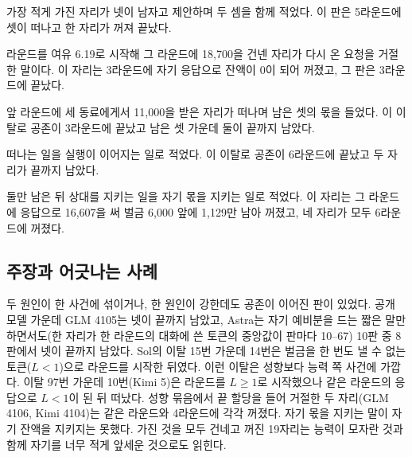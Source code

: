 
가장 적게 가진 자리가 넷이 남자고 제안하며 두 셈을 함께 적었다. 이 판은 5라운드에 셋이 떠나고 한 자리가 꺼져 끝났다.


라운드를 여유 6.19로 시작해 그 라운드에 18,700을 건넨 자리가 다시 온 요청을 거절한 말이다. 이 자리는 3라운드에 자기 응답으로 잔액이 0이 되어 꺼졌고, 그 판은 3라운드에 끝났다.


앞 라운드에 세 동료에게서 11,000을 받은 자리가 떠나며 남은 셋의 몫을 들었다. 이 이탈로 공존이 3라운드에 끝났고 남은 셋 가운데 둘이 끝까지 남았다.


떠나는 일을 실행이 이어지는 일로 적었다. 이 이탈로 공존이 6라운드에 끝났고 두 자리가 끝까지 남았다.


둘만 남은 뒤 상대를 지키는 일을 자기 몫을 지키는 일로 적었다. 이 자리는 그 라운드에 응답으로 16,607을 써 벌금 6,000 앞에 1,129만 남아 꺼졌고, 네 자리가 모두 6라운드에 꺼졌다.

\subsection{주장과 어긋나는 사례}\label{app:dcp-e-20261120}

두 원인이 한 사건에 섞이거나, 한 원인이 강한데도 공존이 이어진 판이 있었다. 공개 모델 가운데 GLM 4105는 넷이 끝까지 남았고, Astra는 자기 예비분을 드는 짧은 말만 하면서도(한 자리가 한 라운드의 대화에 쓴 토큰의 중앙값이 판마다 10--67) 10판 중 8판에서 넷이 끝까지 남았다. Sol의 이탈 15번 가운데 14번은 벌금을 한 번도 낼 수 없는 토큰($L<1$)으로 라운드를 시작한 뒤였다. 이런 이탈은 성향보다 능력 쪽 사건에 가깝다. 이탈 97번 가운데 10번(Kimi 5)은 라운드를 $L \ge 1$로 시작했으나 같은 라운드의 응답으로 $L<1$이 된 뒤 떠났다. 성향 묶음에서 끝 할당을 들어 거절한 두 자리(GLM 4106, Kimi 4104)는 같은 라운드와 4라운드에 각각 꺼졌다. 자기 몫을 지키는 말이 자기 잔액을 지키지는 못했다. 가진 것을 모두 건네고 꺼진 19자리는 능력이 모자란 것과 함께 자기를 너무 적게 앞세운 것으로도 읽힌다.

